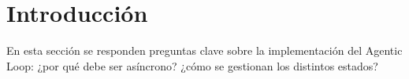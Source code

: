 \section{Introducción}
En esta sección se responden preguntas clave sobre la implementación del Agentic Loop: ¿por qué debe ser asíncrono? ¿cómo se gestionan los distintos estados?

